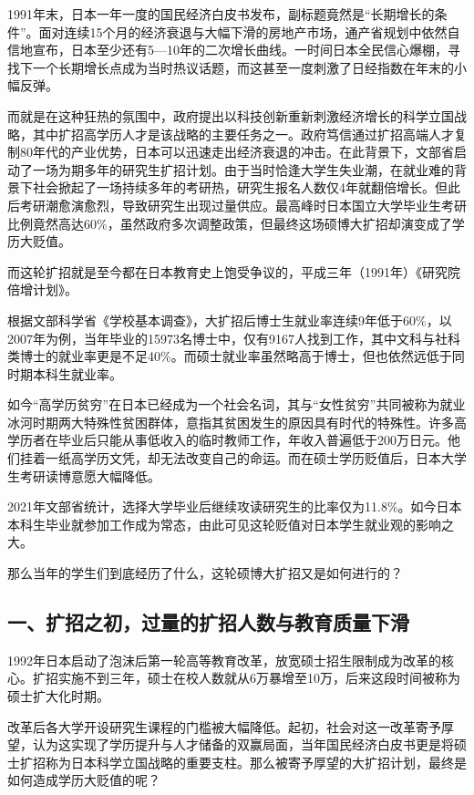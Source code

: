 1991年末，日本一年一度的国民经济白皮书发布，副标题竟然是“长期增长的条件”。面对连续15个月的经济衰退与大幅下滑的房地产市场，通产省规划中依然自信地宣布，日本至少还有5—10年的二次增长曲线。一时间日本全民信心爆棚，寻找下一个长期增长点成为当时热议话题，而这甚至一度刺激了日经指数在年末的小幅反弹。

而就是在这种狂热的氛围中，政府提出以科技创新重新刺激经济增长的科学立国战略，其中扩招高学历人才是该战略的主要任务之一。政府笃信通过扩招高端人才复制80年代的产业优势，日本可以迅速走出经济衰退的冲击。在此背景下，文部省启动了一场为期多年的研究生扩招计划。由于当时恰逢大学生失业潮，在就业难的背景下社会掀起了一场持续多年的考研热，研究生报名人数仅4年就翻倍增长。但此后考研潮愈演愈烈，导致研究生出现过量供应。最高峰时日本国立大学毕业生考研比例竟然高达60\%，虽然政府多次调整政策，但最终这场硕博大扩招却演变成了学历大贬值。

而这轮扩招就是至今都在日本教育史上饱受争议的，平成三年（1991年）《研究院倍增计划》。

根据文部科学省《学校基本调查》，大扩招后博士生就业率连续9年低于60\%，以2007年为例，当年毕业的15973名博士中，仅有9167人找到工作，其中文科与社科类博士的就业率更是不足40\%。而硕士就业率虽然略高于博士，但也依然远低于同时期本科生就业率。

如今“高学历贫穷”在日本已经成为一个社会名词，其与“女性贫穷”共同被称为就业冰河时期两大特殊性贫困群体，意指其贫困发生的原因具有时代的特殊性。许多高学历者在毕业后只能从事低收入的临时教师工作，年收入普遍低于200万日元。他们挂着一纸高学历文凭，却无法改变自己的命运。而在硕士学历贬值后，日本大学生考研读博意愿大幅降低。

2021年文部省统计，选择大学毕业后继续攻读研究生的比率仅为11.8\%。如今日本本科生毕业就参加工作成为常态，由此可见这轮贬值对日本学生就业观的影响之大。

那么当年的学生们到底经历了什么，这轮硕博大扩招又是如何进行的？

\subsection{一、扩招之初，过量的扩招人数与教育质量下滑}

1992年日本启动了泡沫后第一轮高等教育改革，放宽硕士招生限制成为改革的核心。扩招实施不到三年，硕士在校人数就从6万暴增至10万，后来这段时间被称为硕士扩大化时期。

改革后各大学开设研究生课程的门槛被大幅降低。起初，社会对这一改革寄予厚望，认为这实现了学历提升与人才储备的双赢局面，当年国民经济白皮书更是将硕士扩招称为日本科学立国战略的重要支柱。那么被寄予厚望的大扩招计划，最终是如何造成学历大贬值的呢？

